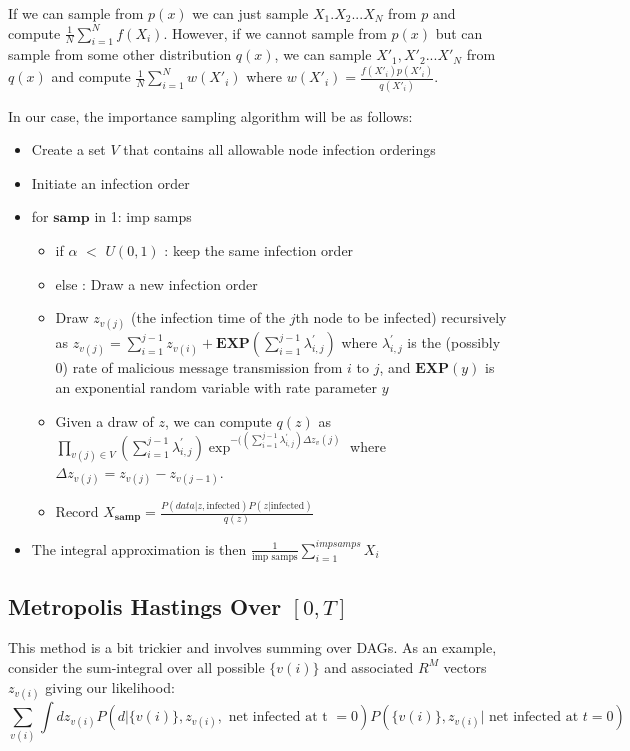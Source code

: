 \documentclass{article}
\begin{document}
If we can sample from $p(x)$ we can just sample $X_1. X_2 ...X_N$ from $p$ and compute $\frac{1}{N}\sum_{i=1}^Nf(X_i)$.
However, if we cannot sample from $p(x)$ but can sample from some other distribution $q(x)$, we can sample $X'_1, X'_2 ...X'_N$ from 
$q(x)$ and compute $\frac{1}{N}\sum_{i=1}^Nw(X'_i)$ where $w(X'_i) = \frac{f(X'_i)p(X'_i)}{q(X'_i)}$.  

In our case, the importance sampling algorithm will be as follows:


\begin{itemize}
\item Create a set $V$ that contains all allowable node infection orderings
\item Initiate an infection order
\item for $\mathbf{samp}$ in 1: imp samps
\begin{itemize}
\item if $\alpha$ $<$ $U(0,1)$ : keep the same infection order
\item else : Draw a new infection order
\item Draw $z_{v(j)}$ (the infection time of the $j$th node to be infected) recursively
as $z_{v(j)} = \sum_{i=1}^{j-1}z_{v(i)} + \mathbf{EXP}(\sum_{i=1}^{j-1}\lambda^{'}_{i,j})$ 
where $\lambda^{'}_{i,j}$ is the (possibly 0) rate of malicious message transmission from $i$ to $j$,  and $\mathbf{EXP}(y)$ is 
an exponential random variable with rate parameter $y$
\item Given a draw of $z$, we can compute $q(z)$ as $\prod_{v(j)\in V}(\sum_{i=1}^{j-1}\lambda^{'}_{i,j})\exp^{-((\sum_{i=1}^{j-1}\lambda^{'}_{i,j})\Delta z_v(j)}$
where $\Delta z_{v(j)} = z_{v(j)} - z_{v(j-1)}$.
\item Record $X_{\mathbf{samp}} = \frac{P(data |z, \text{infected})P(z|\text{infected})}{q(z)}$
\end{itemize}
\item The integral approximation is then $\frac{1}{\text{imp samps}}\sum_{i=1}^{imp samps}X_i$
\end{itemize}

\subsection{Metropolis Hastings Over  $[0, T]$}
        This method is a bit trickier and involves summing over DAGs.  
        As an example, consider the sum-integral over all possible $\{v(i)\}$ and
        associated $R^M$ vectors $z_{v(i)}$ giving our likelihood:
\begin{equation}
\sum_{v(i)} \int dz_{v(i)} P(d | \{v(i)\}, z_{v(i)}, \text{ net infected at t } = 0)  P(\{v(i)\}, z_{v(i)} | \text{ net infected at } t=0)
\label{sumdags}
\end{equation}
\end{document}
